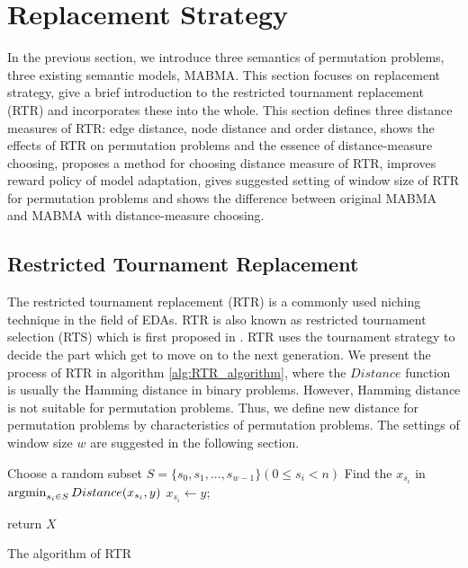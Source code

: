 \section{Replacement Strategy}
\label{ch:replacement_strategy}

In the previous section, we introduce three semantics of permutation problems, three existing semantic models, MABMA. This section focuses on replacement strategy, give a brief introduction to the restricted tournament replacement (RTR) and incorporates these into the whole. This section defines three distance measures of RTR: edge distance, node distance and order distance, shows the effects of RTR on permutation problems and the essence of distance-measure choosing, proposes a method for choosing distance measure of RTR, improves reward policy of model adaptation, gives suggested setting of window size of RTR for permutation problems and shows the difference between original MABMA and MABMA with distance-measure choosing.




\subsection{Restricted Tournament Replacement}
The restricted tournament replacement (RTR) is a commonly used niching technique in the field of EDAs. RTR is also known as restricted tournament selection (RTS) which is first proposed in \citep{harik1995rts}. RTR uses the tournament strategy to decide the part which get to move on to the next generation. We present the process of RTR in algorithm \ref{alg:RTR_algorithm}, where the $Distance$ function is usually the Hamming distance in binary problems. However, Hamming distance is not suitable for permutation problems. Thus, we define new distance for permutation problems by characteristics of permutation problems. The settings of window size $w$ are suggested in the following section.


\begin{algorithm}[htbp]
    {
        Choose a random subset $S =\lbrace s_0, s_1, ..., s_{w-1}\rbrace (0\leq s_i <n)$\;
        Find the $x_{s_i}$ in $\mathop{\argmin}_{{s_i} \in S} Distance(x_{s_i},y)$\;
              {
        $x_{s_i} \leftarrow y$;
        }
        
    }
    return $X$\;
    \caption{The algorithm of RTR}
    \label{alg:RTR_algorithm}
\end{algorithm}


